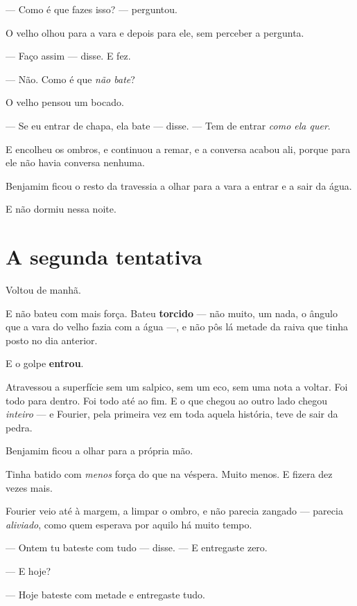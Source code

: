\documentclass[livro.tex]{subfiles}
\begin{document}
--- Como é que fazes isso? --- perguntou.

O velho olhou para a vara e depois para ele, sem perceber a pergunta.

--- Faço assim --- disse. E fez.

--- Não. Como é que \emph{não bate}?

O velho pensou um bocado.

--- Se eu entrar de chapa, ela bate --- disse. --- Tem de entrar \emph{como ela quer}.

E encolheu os ombros, e continuou a remar, e a conversa acabou ali, porque para ele não havia conversa nenhuma.

\medskip

Benjamim ficou o resto da travessia a olhar para a vara a entrar e a sair da água.

E não dormiu nessa noite.

\section*{A segunda tentativa}

Voltou de manhã.

E não bateu com mais força. Bateu \textbf{torcido} --- não muito, um nada, o ângulo que a vara do velho fazia com a
água ---, e não pôs lá metade da raiva que tinha posto no dia anterior.

\medskip

E o golpe \textbf{entrou}.

\medskip

Atravessou a superfície sem um salpico, sem um eco, sem uma nota a voltar. Foi todo para dentro. Foi todo até ao
fim. E o que chegou ao outro lado chegou \emph{inteiro} --- e Fourier, pela primeira vez em toda aquela história,
teve de sair da pedra.

\medskip

Benjamim ficou a olhar para a própria mão.

Tinha batido com \emph{menos} força do que na véspera. Muito menos. E fizera dez vezes mais.

\medskip

Fourier veio até à margem, a limpar o ombro, e não parecia zangado --- parecia \emph{aliviado}, como quem esperava
por aquilo há muito tempo.

--- Ontem tu bateste com tudo --- disse. --- E entregaste zero.

--- E hoje?

--- Hoje bateste com metade e entregaste tudo.
\end{document}
